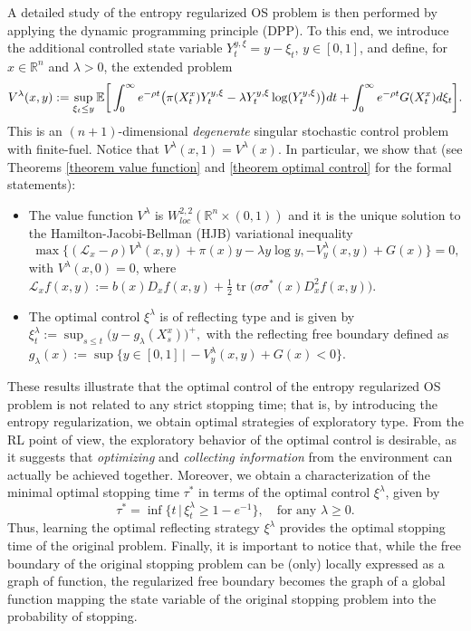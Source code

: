 \documentclass[11pt]{amsart}
\theoremstyle{plain}
\def \dd{{\rm d}}
\def \R{\mathbb{R}}
\DeclareMathOperator*{\tr}{tr}
\numberwithin{equation}{section}
\begin{document}
A detailed study of the entropy regularized OS problem is then performed by applying the dynamic programming principle (DPP).  
To this end, we introduce the additional controlled state variable $Y^{y,\xi}_t = y - \xi_t$, $y \in [0,1]$, and define, for $x \in \R^n$ and $\lambda >0$, the extended problem
\begin{equation*}
     V^\lambda (x,y):=\sup _{\xi_t \leq y} \mathbb E \bigg[ \int _0^\infty e ^{-\rho t} \big( \pi (X^x_t) Y^{y,\xi}_t - \lambda Y^{y,\xi}_t \log (Y^{y,\xi}_t) \big)\dd t  +  \int _0^\infty e ^{-\rho t} G(X^x_t) \dd \xi_t \bigg].
\end{equation*}
This is an $(n+1)$-dimensional {\it degenerate} singular stochastic control problem with finite-fuel.
Notice that $V^\lambda (x,1) = V^\lambda (x)$.
In particular, we show that (see Theorems \ref{theorem value function} and \ref{theorem optimal control} for the formal statements):
\begin{itemize}
\item The value function ${{V^\lambda}}$ is $ W_{loc}^{2, 2}( \R^n \times (0,1))$ and it is the unique solution to the Hamilton-Jacobi-Bellman (HJB) variational inequality 
$$
\max \big\{ \left(\mathcal{L}_{x} -\rho \right) V^\lambda(x, y) + \pi (x) {y - \lambda y \log y}, - V^\lambda_{y}(x, y) + G(x) \big\}=0, 
$$
 with $V^\lambda(x, 0)=0$,  where
$
\mathcal L _x f (x,y) := b (x) D_x f(x,y)  + \frac12 \tr \big( \sigma  \sigma^* (x) D_x^2 f (x,y) \big).
$
\item The optimal control $\xi^{\lambda}$ is of reflecting type and is given by
$
{\xi^\lambda_t := \sup_{s\leq t } \big( y- g_\lambda(X^x_s) \big)^+},
$
with the reflecting free boundary  defined as ${{g_\lambda}} (x) := \sup \big\{ y \in[0,1]  \, | \, - V^\lambda_y (x,y) +  G(x) < 0 \big\}$.
\end{itemize}
These results illustrate that the optimal control of the entropy regularized OS problem is not related to any strict stopping time; that is, by introducing the entropy regularization, we obtain optimal strategies of exploratory type.
From the RL point of view, the exploratory behavior of the optimal control is desirable, as it suggests that {\it optimizing} and {\it collecting information} from the environment can actually be achieved together. 
{Moreover, we obtain a characterization of the minimal optimal stopping time $\tau^*$ in terms of the optimal control $\xi^\lambda$, given by 
$$
\tau ^* = \inf \{ t \, | \, \xi^\lambda_t \geq 1-e^{-1} \}, \quad \text{for any $\lambda \geq 0$.}
$$
Thus, learning the optimal reflecting strategy $\xi^\lambda$ provides the optimal stopping time of the original problem.
Finally, it is important to notice that, while the free boundary of the original stopping problem can be (only) locally expressed as a graph of function, the regularized free boundary becomes the graph of a global function mapping the state variable of the original stopping problem into the probability of stopping.}
\end{document}
